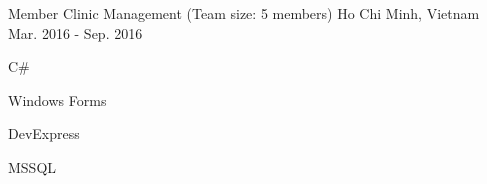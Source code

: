 \begin{cventries}
  \cventry
    {Member} %
    {Clinic Management (Team size: 5 members)} %
    {Ho Chi Minh, Vietnam} %
    {Mar. 2016 - Sep. 2016} %
    {
      \begin{cvitems} %
        \item {C\#}
        \item {Windows Forms}
        \item {DevExpress}
        \item {MSSQL}
      \end{cvitems}
    }

\end{cventries}
